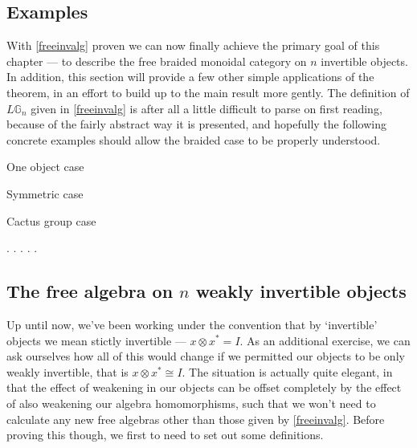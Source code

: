 \subsection{Examples}

With \cref{freeinvalg} proven we can now finally achieve the primary goal of this chapter --- to describe the free braided monoidal category on $n$ invertible objects. In addition, this section will provide a few other simple applications of the theorem, in an effort to build up to the main result more gently. The definition of $L\mathbb{G}_n$ given in \ref{freeinvalg} is after all a little difficult to parse on first reading, because of the fairly abstract way it is presented, and hopefully the following concrete examples should allow the braided case to be properly understood.

\begin{prop} One object case
\end{prop}

\begin{prop} Symmetric case
\end{prop}

\begin{prop} Cactus group case
\end{prop}

.
.
.
.
.


\subsection{The free algebra on $n$ weakly invertible objects}

Up until now, we've been working under the convention that by `invertible' objects we mean stictly invertible --- $x \otimes x^* = I$. As an additional exercise, we can ask ourselves how all of this would change if we permitted our objects to be only weakly invertible, that is $x \otimes x^* \cong I$. The situation is actually quite elegant, in that the effect of weakening in our objects can be offset completely by the effect of also weakening our algebra homomorphisms, such that we won't need to calculate any new free algebras other than those given by \cref{freeinvalg}. Before proving this though, we first to need to set out some definitions.

